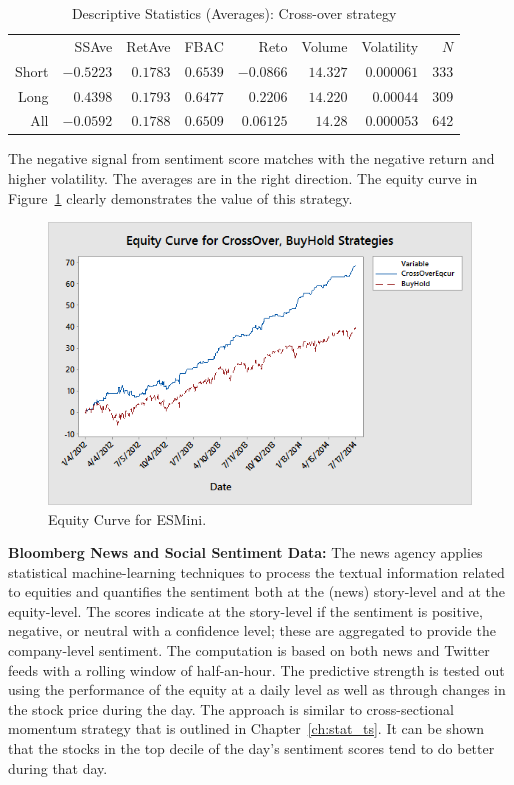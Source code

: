         \begin{table}[!ht]
        \centering
        \caption{Descriptive Statistics (Averages): Cross-over strategy \label{tab:descstatcross}}
        \begin{tabular}{rrrrrrrr}
         & SSAve & RetAve & FBAC & Reto & Volume & Volatility & $N$ \\
        Short  & $-0.5223$ & $0.1783$ & $0.6539$ & $-0.0866$ & $14.327$ & $0.000061$ & 333 \\
         Long & $0.4398$ & $0.1793$ & $0.6477$ & $0.2206$ & $14.220$ & $0.00044$ & 309 \\
         All & $-0.0592$ & $0.1788$ & $0.6509$ & $0.06125$ & $14.28$ & $0.000053$ & 642
        \end{tabular} 
        \end{table}

The negative signal from sentiment score matches with the negative return and higher volatility. The averages are in the right direction. The equity curve in Figure~\ref{fig:equitycross} clearly demonstrates the value of this strategy. \twomedskip

        \begin{figure}[!ht]
        \centering
        \includegraphics[width=\textwidth]{chapters/chapter_news_an/figures/ch4sec4equitycross} 
        \caption{Equity Curve for ESMini. \label{fig:equitycross}}
        \end{figure}

\noindent \textbf{Bloomberg News and Social Sentiment Data:} The news agency applies statistical machine-learning techniques to process the textual information related to equities and quantifies the sentiment both at the (news) story-level and at the equity-level. The scores indicate at the story-level if the sentiment is positive, negative, or neutral with a confidence level; these are aggregated to provide the company-level sentiment. The computation is based on both news and Twitter feeds with a rolling window of half-an-hour. The predictive strength is tested out using the performance of the equity at a daily level as well as through changes in the stock price during the day. The approach is similar to cross-sectional momentum strategy that is outlined in Chapter~\ref{ch:stat_ts}. It can be shown that the stocks in the top decile of the day's sentiment scores tend to do better during that day. 


